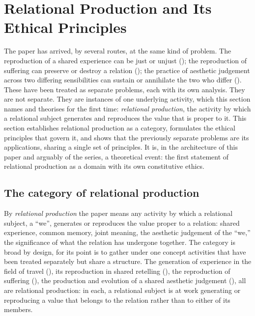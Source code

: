 \section{Relational Production and Its Ethical Principles}
\label{p21:sec:relational-production}

\noindent
The paper has arrived, by several routes, at the same kind of problem. The reproduction of a shared experience can be just or unjust (); the reproduction of suffering can preserve or destroy a relation (); the practice of aesthetic judgement across two differing sensibilities can sustain or annihilate the two who differ (). These have been treated as separate problems, each with its own analysis. They are not separate. They are instances of one underlying activity, which this section names and theorises for the first time: \emph{relational production}, the activity by which a relational subject generates and reproduces the value that is proper to it. This section establishes relational production as a category, formulates the ethical principles that govern it, and shows that the previously separate problems are its applications, sharing a single set of principles. It is, in the architecture of this paper and arguably of the series, a theoretical event: the first statement of relational production as a domain with its own constitutive ethics.

\subsection{The category of relational production}
\label{p21:sub:rp-category}

By \emph{relational production} the paper means any activity by which a relational subject, a ``we'', generates or reproduces the value proper to a relation: shared experience, common memory, joint meaning, the aesthetic judgement of the ``we,'' the significance of what the relation has undergone together. The category is broad by design, for its point is to gather under one concept activities that have been treated separately but share a structure. The generation of experience in the field of travel (), its reproduction in shared retelling (), the reproduction of suffering (), the production and evolution of a shared aesthetic judgement (), all are relational production: in each, a relational subject is at work generating or reproducing a value that belongs to the relation rather than to either of its members.

